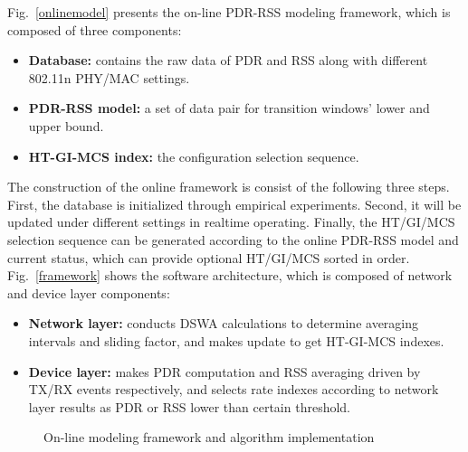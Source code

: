 \documentclass[draftclsnofoot,journal,onecolumn,11pt]{IEEEtran}
\begin{document}
Fig.~\ref{onlinemodel} presents the on-line PDR-RSS modeling framework, which is composed of three components:
\begin{itemize}
  \item \textbf{Database:} contains the raw data of PDR and RSS along with different 802.11n PHY/MAC settings.
  \item \textbf{PDR-RSS model:} a set of data pair for transition windows' lower and upper bound.
  \item \textbf{HT-GI-MCS index:} the configuration selection sequence.
\end{itemize}

The construction of the online framework is consist of the following three steps. First, the database is initialized through empirical experiments. Second, it will be updated under different settings in realtime operating. Finally, the HT/GI/MCS selection sequence can be generated according to the online PDR-RSS model and current status, which can provide optional HT/GI/MCS sorted in order. Fig.~\ref{framework} shows the software architecture, which is composed of network and device layer components:
\begin{itemize}
  \item \textbf{Network layer:} conducts DSWA calculations to determine averaging intervals and sliding factor, and makes update to get HT-GI-MCS indexes.
  \item \textbf{Device layer:} makes PDR computation and RSS averaging driven by TX/RX events respectively, and selects rate indexes according to network layer results as PDR or RSS lower than certain threshold.
\end{itemize}

\begin{figure}[!htp]
\centerline{
}
\caption{On-line modeling framework and algorithm implementation}
\label{implamentation}
\end{figure}
\end{document}

